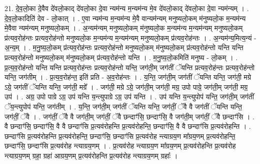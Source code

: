 \documentclass[17pt]{extarticle}
\begin{document}
21. दे॒व॒लो॒का दे॒वैव दे॑वलो॒काद् दे॑वलो॒का दे॒वा न्यम॑न्य म॒न्यम॑न्य मे॒व दे॑वलो॒काद् दे॑वलो॒का दे॒वा न्यम॑न्यम् । . दे॒व॒लो॒कादिति॑ देव - लो॒कात् । . ए॒वा न्यम॑न्य म॒न्यम॑न्य मे॒वै वान्यम॑न्यम् मनुष्यलो॒कम् म॑नुष्यलो॒क म॒न्यम॑न्य मे॒वैवा न्यम॑न्यम् मनुष्यलो॒कम् । . अ॒न्यम॑न्यम् मनुष्यलो॒कम् म॑नुष्यलो॒क म॒न्यम॑न्य म॒न्यम॑न्यम् मनुष्यलो॒कम् प्र॑त्यव॒रोह॑न्तः प्रत्यव॒रोह॑न्तो मनुष्यलो॒क म॒न्यम॑न्य म॒न्यम॑न्यम् मनुष्यलो॒कम् प्र॑त्यव॒रोह॑न्तः । . अ॒न्यम॑न्य॒मित्य॒न्यं - अ॒न्य॒म् । . म॒नु॒ष्य॒लो॒कम् प्र॑त्यव॒रोह॑न्तः प्रत्यव॒रोह॑न्तो मनुष्यलो॒कम् म॑नुष्यलो॒कम् प्र॑त्यव॒रोह॑न्तो यन्ति यन्ति प्रत्यव॒रोह॑न्तो मनुष्यलो॒कम् म॑नुष्यलो॒कम् प्र॑त्यव॒रोह॑न्तो यन्ति । . म॒नु॒ष्य॒लो॒कमिति॑ मनुष्य - लो॒कम् । . प्र॒त्य॒व॒रोह॑न्तो यन्ति यन्ति प्रत्यव॒रोह॑न्तः प्रत्यव॒रोह॑न्तो यन्ति॒ जग॑ती॒म् जग॑तीं ॅयन्ति प्रत्यव॒रोह॑न्तः प्रत्यव॒रोह॑न्तो यन्ति॒ जग॑तीम् । . प्र॒त्य॒व॒रोह॑न्त॒ इति॑ प्रति - अ॒व॒रोह॑न्तः । . य॒न्ति॒ जग॑ती॒म् जग॑तीं ॅयन्ति यन्ति॒ जग॑ती॒ मग्रे ऽग्रे॒ जग॑तीं ॅयन्ति यन्ति॒ जग॑ती॒ मग्रे᳚ । . जग॑ती॒ मग्रे ऽग्रे॒ जग॑ती॒म् जग॑ती॒ मग्र॒ उपो पाग्रे॒ जग॑ती॒म् जग॑ती॒ मग्र॒ उप॑ । . अग्र॒ उपो पाग्रे ऽग्र॒ उप॑ यन्ति य॒न्त्युपाग्रे ऽग्र॒ उप॑ यन्ति । . उप॑ यन्ति य॒न्त्युपोप॑ यन्ति॒ जग॑ती॒म् जग॑तीं ॅय॒न्त्युपोप॑ यन्ति॒ जग॑तीम् । . य॒न्ति॒ जग॑ती॒म् जग॑तीं ॅयन्ति यन्ति॒ जग॑तीं॒ ॅवै वै जग॑तीं ॅयन्ति यन्ति॒ जग॑तीं॒ ॅवै । . जग॑तीं॒ ॅवै वै जग॑ती॒म् जग॑तीं॒ ॅवै छन्दाꣳ॑सि॒ छन्दाꣳ॑सि॒ वै जग॑ती॒म् जग॑तीं॒ ॅवै छन्दाꣳ॑सि । . वै छन्दाꣳ॑सि॒ छन्दाꣳ॑सि॒ वै वै छन्दाꣳ॑सि प्र॒त्यव॑रोहन्ति प्र॒त्यव॑रोहन्ति॒ छन्दाꣳ॑सि॒ वै वै छन्दाꣳ॑सि प्र॒त्यव॑रोहन्ति । . छन्दाꣳ॑सि प्र॒त्यव॑रोहन्ति प्र॒त्यव॑रोहन्ति॒ छन्दाꣳ॑सि॒ छन्दाꣳ॑सि प्र॒त्यव॑रोह न्त्याग्रय॒ण मा᳚ग्रय॒णम् प्र॒त्यव॑रोहन्ति॒ छन्दाꣳ॑सि॒ छन्दाꣳ॑सि प्र॒त्यव॑रोह न्त्याग्रय॒णम् । . प्र॒त्यव॑रोह न्त्याग्रय॒ण मा᳚ग्रय॒णम् प्र॒त्यव॑रोहन्ति प्र॒त्यव॑रोह न्त्याग्रय॒णम् ग्रहा॒ ग्रहा॑ आग्रय॒णम् प्र॒त्यव॑रोहन्ति प्र॒त्यव॑रोह न्त्याग्रय॒णम् ग्रहाः᳚ । \newline
\end{document}
